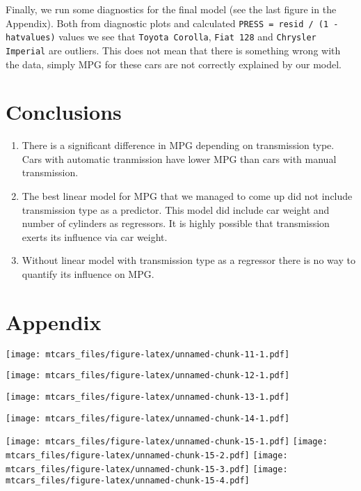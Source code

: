 \documentclass[10pt,]{article}
\begin{document}
Finally, we run some diagnostics for the final model (see the last
figure in the Appendix). Both from diagnostic plots and calculated
\texttt{PRESS = resid / (1 - hatvalues)} values we see that
\texttt{Toyota Corolla}, \texttt{Fiat 128} and
\texttt{Chrysler Imperial} are outliers. This does not mean that there
is something wrong with the data, simply MPG for these cars are not
correctly explained by our model.

\section{Conclusions}\label{conclusions}

\begin{enumerate}
\def\labelenumi{\arabic{enumi}.}
\item
  There is a significant difference in MPG depending on transmission
  type. Cars with automatic tranmission have lower MPG than cars with
  manual transmission.
\item
  The best linear model for MPG that we managed to come up did not
  include transmission type as a predictor. This model did include car
  weight and number of cylinders as regressors. It is highly possible
  that transmission exerts its influence via car weight.
\item
  Without linear model with transmission type as a regressor there is no
  way to quantify its influence on MPG.
\end{enumerate}

\section{Appendix}\label{appendix}

\texttt{[image: mtcars\_files/figure-latex/unnamed-chunk-11-1.pdf]}

\texttt{[image: mtcars\_files/figure-latex/unnamed-chunk-12-1.pdf]}

\texttt{[image: mtcars\_files/figure-latex/unnamed-chunk-13-1.pdf]}

\texttt{[image: mtcars\_files/figure-latex/unnamed-chunk-14-1.pdf]}

\texttt{[image: mtcars\_files/figure-latex/unnamed-chunk-15-1.pdf]}
\texttt{[image: mtcars\_files/figure-latex/unnamed-chunk-15-2.pdf]}
\texttt{[image: mtcars\_files/figure-latex/unnamed-chunk-15-3.pdf]}
\texttt{[image: mtcars\_files/figure-latex/unnamed-chunk-15-4.pdf]}
\end{document}
